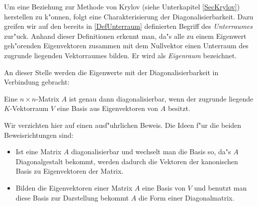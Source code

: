 Um eine Beziehung zur Methode von Krylov (siehe Unterkapitel 
\ref{SecKrylov}) herstellen zu k"onnen, folgt 
eine Charakterisierung der Diagonalisierbarkeit. Dazu greifen wir auf 
den bereits in
\ref{DefUnterraum} definierten Begriff des {\em Unterraumes} zur"uck.
Anhand dieser Definitionen erkennt man, da"s alle zu einem Eigenwert
geh"orenden Eigenvektoren zusammen mit dem Nullvektor einen Unterraum
des zugrunde liegenden Vektorraumes bilden. Er wird als
{\em Eigenraum}  bezeichnet.

An dieser Stelle werden die Eigenwerte mit der Diagonalisierbarkeit
in Verbindung gebracht:
\begin{satz}
\label{SatzEigenDiagonalBasis}
    Eine $n \times n$-Matrix $A$ ist genau dann diagonalisierbar, wenn der 
    zugrunde liegende $K$-Vektorraum $V$ eine Basis aus Eigenvektoren von 
    $A$ besitzt.
\end{satz}
\begin{beweis}
    Wir verzichten hier auf einen ausf"uhrlichen Beweis. Die Ideen f"ur
    die beiden Beweisrichtungen sind:
    \begin{itemize}
    \item 
          Ist eine Matrix $A$ diagonalisierbar und wechselt man die Basis
          so, da"s $A$ Diagonalgestalt bekommt, werden dadurch die
          Vektoren der kanonischen Basis zu Eigenvektoren der Matrix.
    \item
          Bilden die Eigenvektoren einer Matrix $A$ eine Basis von $V$ und
          benutzt man diese Basis zur Darstellung bekommt $A$ die
          Form einer Diagonalmatrix.
    \end{itemize}
\end{beweis}


